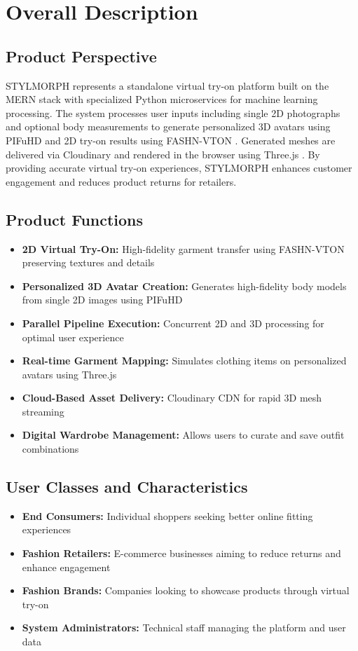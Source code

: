 \documentclass[12pt,a4paper,oneside]{report}
\begin{document}
\section{Overall Description}

\subsection{Product Perspective}
STYLMORPH represents a standalone virtual try-on platform built on the MERN stack \cite{19} with specialized Python microservices for machine learning processing. The system processes user inputs including single 2D photographs and optional body measurements to generate personalized 3D avatars using PIFuHD \cite{1} and 2D try-on results using FASHN-VTON \cite{16}. Generated meshes are delivered via Cloudinary and rendered in the browser using Three.js \cite{6}. By providing accurate virtual try-on experiences, STYLMORPH enhances customer engagement and reduces product returns for retailers.

\subsection{Product Functions}
\begin{itemize}
    \item \textbf{2D Virtual Try-On:} High-fidelity garment transfer using FASHN-VTON preserving textures and details \cite{16}
    \item \textbf{Personalized 3D Avatar Creation:} Generates high-fidelity body models from single 2D images using PIFuHD \cite{1}
    \item \textbf{Parallel Pipeline Execution:} Concurrent 2D and 3D processing for optimal user experience
    \item \textbf{Real-time Garment Mapping:} Simulates clothing items on personalized avatars using Three.js \cite{6}
    \item \textbf{Cloud-Based Asset Delivery:} Cloudinary CDN for rapid 3D mesh streaming
    \item \textbf{Digital Wardrobe Management:} Allows users to curate and save outfit combinations
\end{itemize}

\subsection{User Classes and Characteristics}
\begin{itemize}
    \item \textbf{End Consumers:} Individual shoppers seeking better online fitting experiences
    \item \textbf{Fashion Retailers:} E-commerce businesses aiming to reduce returns and enhance engagement
    \item \textbf{Fashion Brands:} Companies looking to showcase products through virtual try-on
    \item \textbf{System Administrators:} Technical staff managing the platform and user data
\end{itemize}
\end{document}
